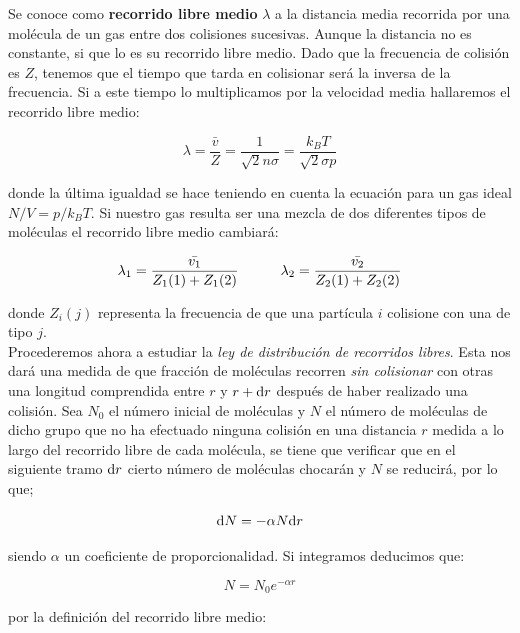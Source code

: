 \documentclass[12pt]{book}
\begin{document}
Se conoce como \textbf{recorrido libre medio} $\lambda$ a la distancia media recorrida por una molécula de un gas entre dos colisiones sucesivas. Aunque la distancia no es constante, si que lo es su recorrido libre medio. Dado que la frecuencia de colisión es $Z$, tenemos que el tiempo que tarda en colisionar será la inversa de la frecuencia. Si a este tiempo lo multiplicamos por la velocidad media hallaremos el recorrido libre medio:

\begin{equation}
\lambda = \frac{\bar{v}}{Z} =  \frac{1}{\sqrt{2} n \sigma} = \frac{k_B T}{\sqrt{2} \sigma p}
\end{equation}

donde la última igualdad se hace teniendo en cuenta la ecuación para un gas ideal $N/V = p/k_BT$. Si nuestro gas resulta ser una mezcla de dos diferentes tipos de moléculas el recorrido libre medio cambiará: 

\begin{equation}
\lambda_1 = \dfrac{\bar{v_1}}{Z_1(1) + Z_1(2)} \quad \quad \quad 
\lambda_2 = \dfrac{\bar{v_2}}{Z_2(1) + Z_2(2)}
\end{equation}

donde $Z_i(j)$ representa la frecuencia de que una partícula $i$ colisione con una de tipo $j$. \\

Procederemos ahora a estudiar la \textit{ley de distribución de recorridos libres}. Esta nos dará una medida de que fracción de moléculas recorren \textit{sin colisionar} con otras una longitud comprendida entre $r$ y $r + \mathrm{d} r$ después de haber realizado una colisión. Sea $N_0$ el número inicial de moléculas y $N$ el número de moléculas de dicho grupo que no ha efectuado ninguna colisión en una distancia $r$ medida a lo largo del recorrido libre de cada molécula, se tiene que verificar que en el siguiente tramo $\mathrm{d} r$ cierto número de moléculas chocarán y $N$ se reducirá, por lo que;

\begin{equation}
\mathrm{d} N = - \alpha N \mathrm{d} r
\end{equation}

siendo $\alpha$ un coeficiente de proporcionalidad. Si integramos deducimos que:

\begin{equation}
N = N_0 e^{-\alpha r}
\end{equation}

por la definición del recorrido libre medio:
\end{document}
